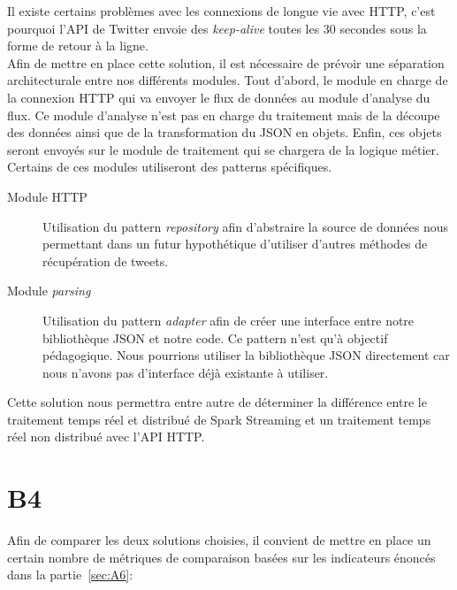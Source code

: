   Il existe certains problèmes avec les connexions de longue vie avec HTTP, c'est pourquoi l'API de Twitter envoie des \textit{keep-alive} toutes les 30 secondes sous la forme de retour à la ligne.\\

  Afin de mettre en place cette solution, il est nécessaire de prévoir une séparation architecturale entre nos différents modules. Tout d'abord, le module en charge de la connexion HTTP qui va envoyer le flux de données au module d'analyse du flux. Ce module d'analyse n'est pas en charge du traitement mais de la découpe des données ainsi que de la transformation du JSON en objets. Enfin, ces objets seront envoyés sur le module de traitement qui se chargera de la logique métier.\\

  Certains de ces modules utiliseront des patterns spécifiques.
  \begin{description}
    \item[Module HTTP] Utilisation du pattern \textit{repository} afin d'abstraire la source de données nous permettant dans un futur hypothétique d'utiliser d'autres méthodes de récupération de tweets.
    \item[Module \textit{parsing}] Utilisation du pattern \textit{adapter} afin de créer une interface entre notre bibliothèque JSON et notre code. Ce pattern n'est qu'à objectif pédagogique. Nous pourrions utiliser la bibliothèque JSON directement car nous n'avons pas d'interface déjà existante à utiliser.
  \end{description}

  Cette solution nous permettra entre autre de déterminer la différence entre le traitement temps réel et distribué de Spark Streaming et un traitement temps réel non distribué avec l'API HTTP.


\section{B4}
\label{sec:B4}
  Afin de comparer les deux solutions choisies, il convient de mettre en place un certain nombre de métriques de comparaison basées sur les indicateurs énoncés dans la partie~\ref{sec:A6}:

